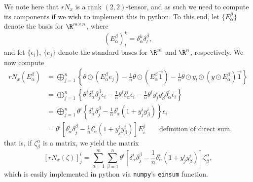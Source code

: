 We note here that $rN_x$ is a rank $(2,2)$-tensor, and as such we need to compute its components if we wish to implement this in python.  To this end, let $\{E_\alpha^\beta\}$ denote the basis for $\R^{m\times n}$, where
$$(E^\beta_\alpha)^k_l=\delta^k_\alpha\delta_l^\beta,$$
and let $\{\epsilon_i\}$, $\{e_j\}$ denote the standard bases for $\R^m$ and $\R^n$, respectively.  We now compute
\begin{align*}
	rN_x(E_\alpha^\beta)&=\bigoplus_{j=1}^n\left\{\theta\odot(E_\alpha^\beta e_j)-\frac{1}{n}\theta\odot(E_\alpha^\beta\vec{1})-\frac{1}{n}\theta\odot y_l\odot(y\odot E_\alpha^\beta)\vec{1}\right\}\\
	&=\bigoplus_{j=1}^n\left\{\theta^i\delta_\alpha^i\delta_j^\beta\epsilon_i-\frac{1}{n}\theta^i\delta^i_\alpha\epsilon_i-\frac{1}{n}\theta^iy^i_jy^i_\beta\delta^i_\alpha\epsilon_i\right\}\\
	&=\bigoplus_{j=1}^n\theta^i\left\{\delta_\alpha^i\delta_j^\beta-\frac{1}{n}\delta_\alpha^i(1+y_j^iy_\beta^i)\right\}\epsilon_i\\
	&=\theta^i\left[\delta_\alpha^i\delta_j^\beta-\frac{1}{n}\delta_\alpha^i(1+y_j^iy_\beta^i)\right]E_i^j\qquad\text{definition of direct sum},
\end{align*}
that is, if $\zeta^\alpha_\beta$ is a matrix, we yield the matrix
$$[rN_x(\zeta)]^i_j=\sum_{\alpha=1}^m\sum_{\beta=1}^n
	\theta^i[\delta_\alpha^i\delta_j^\beta-\frac{1}{n}\delta_\alpha^i(1+y_j^iy_\beta^i)]\zeta^\alpha_\beta,$$
which is easily implemented in python via \texttt{numpy}'s \texttt{einsum} function.
